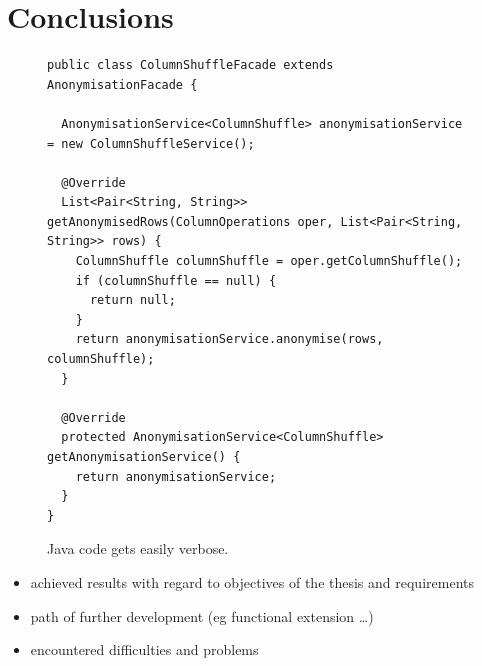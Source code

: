 \documentclass[a4paper,twoside,12pt]{book}
\begin{document}
 
 

\chapter{Conclusions}


\begin{figure}[h]
\begin{verbatim}
public class ColumnShuffleFacade extends AnonymisationFacade {

  AnonymisationService<ColumnShuffle> anonymisationService = new ColumnShuffleService();

  @Override
  List<Pair<String, String>> getAnonymisedRows(ColumnOperations oper, List<Pair<String, String>> rows) {
    ColumnShuffle columnShuffle = oper.getColumnShuffle();
    if (columnShuffle == null) {
      return null;
    }
    return anonymisationService.anonymise(rows, columnShuffle);
  }

  @Override
  protected AnonymisationService<ColumnShuffle> getAnonymisationService() {
    return anonymisationService;
  }
}
\end{verbatim}
\caption{Java code gets easily verbose.}
\label{fig:lalrpopExemplaryRule}
\end{figure}
\begin{itemize}
\item achieved results with regard to objectives of the thesis and requirements
\item path of further development (eg functional extension …)
\item encountered difficulties and problems
\end{itemize}
\end{document}
